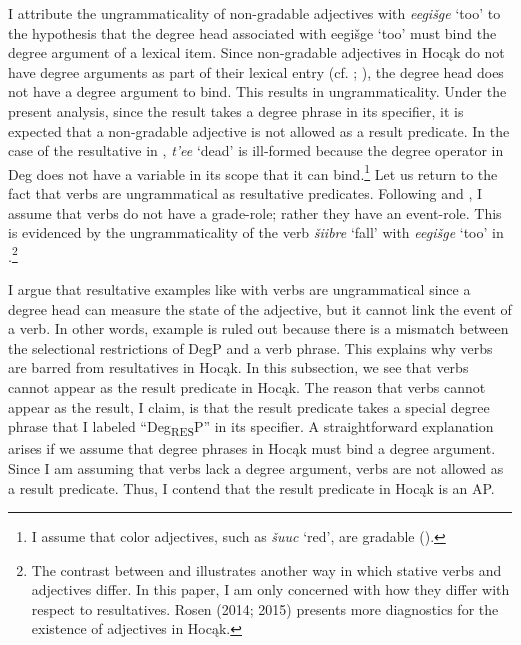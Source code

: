\documentclass[output=paper]{LSP/langsci}
\begin{document}
I attribute the ungrammaticality of non-gradable adjectives with \textit{eegišge} `too' to the hypothesis that the degree head associated with eegišge `too' must bind the degree argument of a lexical item. Since non-gradable adjectives in Hocąk do not have degree arguments as part of their lexical entry (cf. \citealt{Higginbotham1985}; \citealt{Corver1997}), the degree head does not have a degree argument to bind. This results in ungrammaticality. Under the present analysis, since the result takes a degree phrase in its specifier, it is expected that a non-gradable adjective is not allowed as a result predicate. In the case of the resultative in , \textit{t'ee} `dead' is ill-formed because the degree operator in Deg does not have a variable in its scope that it can bind.\footnote{I assume that color adjectives, such as \textit{šuuc} `red', are gradable (\citealt{KennedyMcNally2010}).} Let us return to the fact that verbs are ungrammatical as resultative predicates. Following \citet{Higginbotham1985} and \citet{Corver1997}, I assume that verbs do not have a grade-role; rather they have an event-role. This is evidenced by the ungrammaticality of the verb \textit{šiibre} `fall' with \textit{eegišge} `too' in .\footnote{The contrast between  and  illustrates another way in which stative verbs and adjectives differ. In this paper, I am only concerned with how they differ with respect to resultatives. Rosen (2014; 2015) presents more diagnostics for the existence of adjectives in Hocąk.}

\begin{exe}


\end{exe}

I argue that resultative examples like  with verbs are ungrammatical since a degree head can measure the state of the adjective, but it cannot link the event of a verb. In other words, example  is ruled out because there is a mismatch between the selectional restrictions of DegP and a verb phrase. This explains why verbs are barred from resultatives in Hocąk. In this subsection, we see that verbs cannot appear as the result predicate in Hocąk. The reason that verbs cannot appear as the result, I claim, is that the result predicate takes a special degree phrase that I labeled ``Deg\textsubscript{RES}P'' in its specifier. A straightforward explanation arises if we assume that degree phrases in Hocąk must bind a degree argument. Since I am assuming that verbs lack a degree argument, verbs are not allowed as a result predicate. Thus, I contend that the result predicate in Hocąk is an AP.
\end{document}
